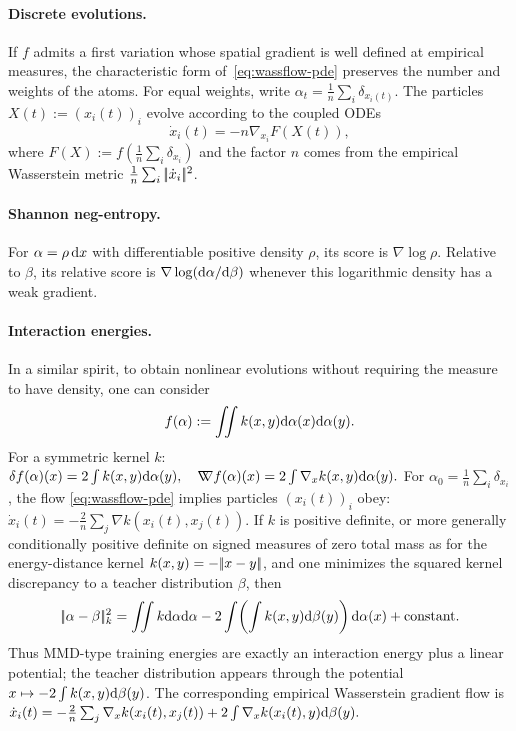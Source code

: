 \paragraph{Discrete evolutions.}
If $f$ admits a first variation whose spatial gradient is well defined at empirical measures, the characteristic form of~\eqref{eq:wassflow-pde} preserves the number and weights of the atoms. For equal weights, write $\alpha_t = \frac{1}{n} \sum_i \delta_{x_i(t)}$. The particles $X(t):= (x_i(t))_i$ evolve according to the coupled ODEs
\begin{equation}
\dot{x}_i(t) = -n\nabla_{x_i} F(X(t)), \label{eq:wassflows-particles}
\end{equation}
where $F(X):= f\left(\frac{1}{n} \sum_i \delta_{x_i}\right)$ and the factor $n$ comes from the empirical Wasserstein metric $\frac1n\sum_i |\!| \dot x_i |\!|^2$.

\paragraph{Shannon neg-entropy.}
\begin{defn}\label{def-score-function}
For $\alpha=\rho\,\mathrm{d} x$ with differentiable positive density $\rho$, its score is $\nabla\log\rho$. Relative to $\beta$, its relative score is $\nabla\log(\mathrm{d}\alpha/\mathrm{d}\beta)$ whenever this logarithmic density has a weak gradient.
\end{defn}
\paragraph{Interaction energies.}
In a similar spirit, to obtain nonlinear evolutions without requiring the measure to have density, one can consider
\begin{equation}
f(\alpha):= \iint k(x, y) \mathrm{d} \alpha(x) \mathrm{d} \alpha(y). \label{eq:quadratic-func}
\end{equation}
For a symmetric kernel $k$: \(\delta f(\alpha)(x) = 2 \int k(x, y) \mathrm{d} \alpha(y), \quad \mathord{\nabla\mkern-9.3mu\nabla} f(\alpha)(x) = 2 \int \nabla_x k(x, y) \mathrm{d} \alpha(y).\)
For $\alpha_0 = \frac{1}{n} \sum_i \delta_{x_i}$, the flow \eqref{eq:wassflow-pde} implies particles $(x_i(t))_i$ obey: \(\dot{x}_i(t) = -\frac{2}{n} \sum_j \nabla k(x_i(t), x_j(t)).\)
If $k$ is positive definite, or more generally conditionally positive definite on signed measures of zero total mass as for the energy-distance kernel $k(x,y)=-|\!| x-y |\!|$, and one minimizes the squared kernel discrepancy to a teacher distribution $\beta$, then
\[
|\!| \alpha-\beta |\!|_k^2
=
\iint k\mathrm{d}\alpha\mathrm{d}\alpha
-2\int\!\left(\int k(x,y)\mathrm{d}\beta(y)\right)\mathrm{d}\alpha(x)
+\mathrm{constant}.
\]
Thus MMD-type training energies are exactly an interaction energy plus a linear potential; the teacher distribution appears through the potential $x\mapsto-2\int k(x,y)\mathrm{d}\beta(y)$. The corresponding empirical Wasserstein gradient flow is
\(\dot x_i(t) = -\frac{2}{n}\sum_j\nabla_x k(x_i(t),x_j(t)) + 2\int\nabla_x k(x_i(t),y)\mathrm{d}\beta(y).\)
